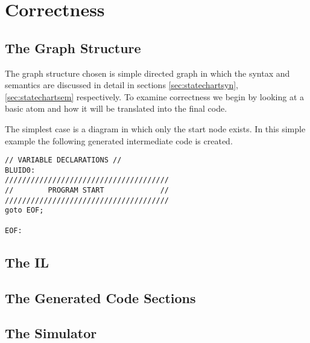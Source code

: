 \section{Correctness}
\subsection{The Graph Structure}
The graph structure chosen is simple directed graph in which the syntax and semantics are discussed in detail in sections \ref{sec:statechartsyn}, \ref{sec:statechartsem} respectively. To examine correctness we begin by looking at a basic atom and how it will be translated into the final code.

The simplest case is a diagram in which only the start node exists.
In this simple example the following generated intermediate code  is created.

\begin{lstlisting}
// VARIABLE DECLARATIONS //
BLUID0:
//////////////////////////////////////
//        PROGRAM START             //
//////////////////////////////////////
goto EOF;

EOF:
\end{lstlisting}


\subsection{The IL}
\subsection{The Generated Code Sections}
\subsection{The Simulator}